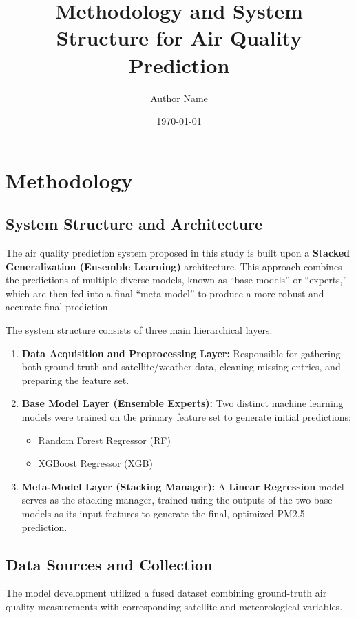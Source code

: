 \documentclass[12pt, a4paper]{article}
\title{Methodology and System Structure for Air Quality Prediction}
\author{Author Name}
\date{\today}
\begin{document}
\maketitle

\section{Methodology}

\subsection{System Structure and Architecture}
The air quality prediction system proposed in this study is built upon a \textbf{Stacked Generalization (Ensemble Learning)} architecture. This approach combines the predictions of multiple diverse models, known as ``base-models'' or ``experts,'' which are then fed into a final ``meta-model'' to produce a more robust and accurate final prediction.

The system structure consists of three main hierarchical layers:
\begin{enumerate}
    \item \textbf{Data Acquisition and Preprocessing Layer:} Responsible for gathering both ground-truth and satellite/weather data, cleaning missing entries, and preparing the feature set.
    \item \textbf{Base Model Layer (Ensemble Experts):} Two distinct machine learning models were trained on the primary feature set to generate initial predictions:
    \begin{itemize}
        \item Random Forest Regressor (RF)
        \item XGBoost Regressor (XGB)
    \end{itemize}
    \item \textbf{Meta-Model Layer (Stacking Manager):} A \textbf{Linear Regression} model serves as the stacking manager, trained using the outputs of the two base models as its input features to generate the final, optimized PM2.5 prediction.
\end{enumerate}

\subsection{Data Sources and Collection}
The model development utilized a fused dataset combining ground-truth air quality measurements with corresponding satellite and meteorological variables.
\end{document}
